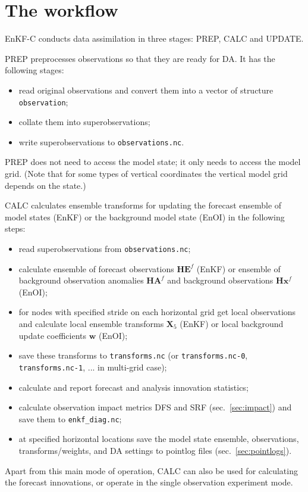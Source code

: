 \documentclass[11pt]{report}
\newcommand{\mb} {\mathbf}
\begin{document}
\section{The workflow}

EnKF-C conducts data assimilation in three stages: PREP, CALC and UPDATE.

PREP preprocesses observations so that they are ready for DA.
It has the following stages:
\begin{itemize}
\item read original observations and convert them into a vector of structure \verb|observation|;
\item collate them into superobservations;
\item write superobservations to \verb|observations.nc|.
\end{itemize}

PREP does not need to access the model state; it only needs to access the model grid.
(Note that for some types of vertical coordinates the vertical model grid depends on the state.)

CALC calculates ensemble transforms for updating the forecast ensemble of model states (EnKF) or the background model state (EnOI) in the following steps:
\begin{itemize}
\item read superobservations from \verb|observations.nc|;
\item calculate ensemble of forecast observations $\mb H \mb E^f$ (EnKF) or ensemble of background observation anomalies $\mb H \mb A^f$ and background observations $\mb H \mb x^f$ (EnOI);
\item for nodes with specified stride on each horizontal grid get local observations and calculate local ensemble transforms $\mb X_5$ (EnKF) or local background update coefficients $\mb w$ (EnOI);
\item save these transforms to \verb|transforms.nc| (or \verb|transforms.nc-0|, \verb|transforms.nc-1|, ... in multi-grid case);
\item calculate and report forecast and analysis innovation statistics;
\item calculate observation impact metrics DFS and SRF (sec.~\ref{sec:impact}) and save them to \verb|enkf_diag.nc|;
\item at specified horizontal locations save the model state ensemble, observations, transforms/weights, and DA settings to pointlog files (sec.~\ref{sec:pointlogs}).
\end{itemize}
Apart from this main mode of operation, CALC can also be used for calculating the forecast innovations, or operate in the single observation experiment mode.
\end{document}
